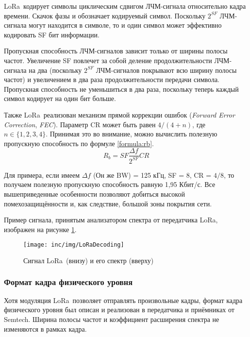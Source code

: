 LoRa\texttrademark~кодирует символы циклическим сдвигом ЛЧМ-сигнала 
относительно кадра 
времени. 
Скачок фазы и обозначает кодируемый символ.
Поскольку $2^{SF}$ ЛЧМ-сигнала могут находится в символе, то и один символ 
может эффективно кодировать SF бит информации.

Пропускная способность ЛЧМ-сигналов зависит только от ширины полосы частот.
Увеличение SF повлечет за собой деление продолжительности ЛЧМ-сигнала на два 
(поскольку $2^{SF}$ ЛЧМ-сигналов покрывают всю ширину полосы частот) и 
увеличением в два раза продолжительности передачи символа.
Пропускная способность не уменьшиться в два раза, поскольку теперь каждый 
символ 
кодирует на один бит больше.

Также LoRa\texttrademark~реализован механизм прямой коррекции ошибок 
(\textit{Forward Error 
Correction}, \textit{FEC}).
Параметр CR может быть равен $4/(4+n)$, где $n \in \{1, 2, 3, 4\}$.
Принимая это во внимание, можно вычислить полезную пропускную способность по 
формуле \ref{formula:rb}.
\begin{equation}
 R_b = SF \frac{\Delta f}{2^{SF}} CR \label{formula:rb}
\end{equation}

Для примера, если имеем $\Delta f$ (Он же BW) = 125 кГц, SF = 8, CR = $4/8$, то 
получаем полезную пропускную способность равную 1,95 Кбит/с.
Все вышеприведенные особенности позволяют добиться высокой помехозащищённости 
и, 
как следствие, большой зоны покрытия сети.

Пример сигнала, принятым анализатором спектра от передатчика 
LoRa\texttrademark, изображен на 
рисунке \ref{fig:loradecoding}.

\begin{figure}[!h]
  \centering
  \texttt{[image: inc/img/LoRaDecoding]}
  \caption{Сигнал LoRa\texttrademark~(внизу) и его спектр (вверху) 
\cite{DecodingLora2018}}
  \label{fig:loradecoding}
\end{figure}

\subsubsection{Формат кадра физического уровня}\label{part:physframe}

Хотя модуляция LoRa\texttrademark~позволяет отправлять произвольные кадры, 
формат кадра 
физического уровня был описан и реализован в передатчика и приёмниках от 
Semtech.
Ширина полосы частот и коэффициент расширения спектра не изменяются в рамках 
кадра.

